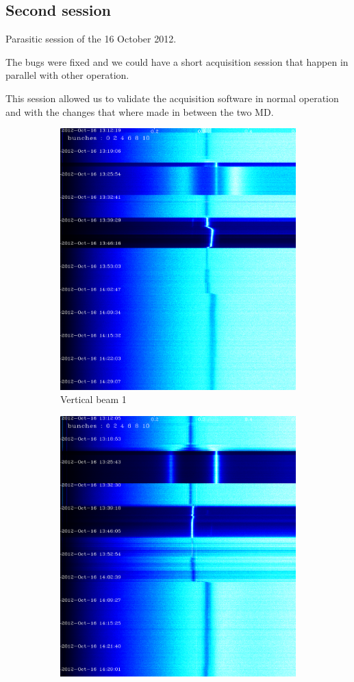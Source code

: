 \subsection{Second session}

Parasitic session of the 16 October 2012. 

The bugs were fixed and we could have a short acquisition session that happen in parallel with other operation.

This session allowed us to validate the acquisition software in normal operation and with the changes that where made in between the two \gls{MD}.

\begin{figure}[H]
\centering
\begin{subfigure}{.5\textwidth}
  \centering
  \includegraphics[width=.8\linewidth]{md-121016-vb1-bunches111111-16.png}
  \caption{Vertical beam 1}
\end{subfigure}%
\begin{subfigure}{.5\textwidth}
  \centering
  \includegraphics[width=.8\linewidth]{md-121016-hb1-bunches111111-16.png}

\end{subfigure}
\end{figure}
